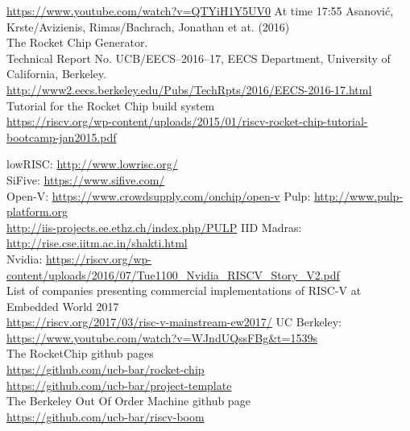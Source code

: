 \documentclass[journal,a4paper]{IEEEtran}
\begin{document}
\bigskip

\begin{thebibliography}{1}
	\url{https://www.youtube.com/watch?v=QTYiH1Y5UV0} At time 17:55
	Asanovi\'c, Krste/Avizienis, Rimas/Bachrach, Jonathan et at. (2016)\\
	The Rocket Chip Generator.\\
	Technical Report No. UCB/EECS--2016--17, EECS Department, University of California, Berkeley.\\
	\url{http://www2.eecs.berkeley.edu/Pubs/TechRpts/2016/EECS-2016-17.html}\\

	Tutorial for the  Rocket Chip build system\\
	\url{https://riscv.org/wp-content/uploads/2015/01/riscv-rocket-chip-tutorial-bootcamp-jan2015.pdf}

		lowRISC: \url{http://www.lowrisc.org/}\\
		SiFive: \url{https://www.sifive.com/}\\
		Open-V: \url{https://www.crowdsupply.com/onchip/open-v}
		Pulp: \url{http://www.pulp-platform.org}\\
		\url{http://iis-projects.ee.ethz.ch/index.php/PULP}
		IID Madras: \url{http://rise.cse.iitm.ac.in/shakti.html}\\
		Nvidia: \url{https://riscv.org/wp-content/uploads/2016/07/Tue1100_Nvidia_RISCV_Story_V2.pdf}\\
		List of companies presenting commercial implementations of RISC-V at Embedded World 2017\\
		\url{https://riscv.org/2017/03/risc-v-mainstream-ew2017/}
		UC Berkeley: \url{https://www.youtube.com/watch?v=WJndUQssFBg&t=1539s}\\
	The RocketChip github pages\\
	\url{https://github.com/ucb-bar/rocket-chip}\\
	\url{https://github.com/ucb-bar/project-template}\\

	The Berkeley Out Of Order Machine github page\\
	\url{https://github.com/ucb-bar/riscv-boom}\\


\end{thebibliography}
\enlargethispage{-5in}
\end{document}
